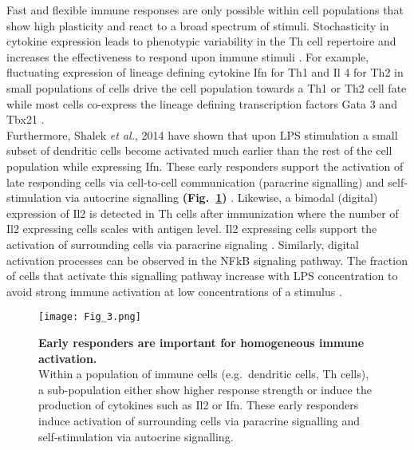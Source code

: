 Fast and flexible immune responses are only possible within cell populations that show high plasticity and react to a broad spectrum of stimuli. Stochasticity in cytokine expression leads to phenotypic variability in the \Gls{Th} cell repertoire and increases the effectiveness to respond upon immune stimuli \citep{Schrom2017}. For example, fluctuating expression of lineage defining cytokine \gls{Ifn}\textgamma{} for Th1 and \gls{Il} 4 for Th2 in small populations of cells drive the cell population towards a Th1 or Th2 cell fate while most cells co-express the lineage defining transcription factors \Gls{Gata} 3 and \Gls{Tbx21} \citep{Fang2013a, Antebi2013}.\\

Furthermore, Shalek \textit{et al.}, 2014 have shown that upon \gls{LPS} stimulation a small subset of dendritic cells become activated much earlier than the rest of the cell population while expressing \gls{Ifn}\textbeta. These early responders support the activation of late responding cells via cell-to-cell communication (paracrine signalling) and self-stimulation via autocrine signalling \textbf{(Fig.~\ref{fig0:noise_immune})} \citep{Shalek2014}. Likewise, a bimodal (digital) expression of Il2 is detected in \gls{Th} cells after immunization where the number of Il2 expressing cells scales with antigen level. Il2 expressing cells support the activation of surrounding cells via paracrine signaling \citep{Fuhrmann2016}. Similarly, digital activation processes can be observed in the \gls{NFkB} signaling pathway. The fraction of cells that activate this signalling pathway increase with LPS concentration to avoid strong immune activation at low concentrations of a stimulus \citep{Kellogg2015b}.

\begin{figure}[!h]
\centering
\texttt{[image: Fig\_3.png]}
\caption[Early responders are important for homogeneous immune activation]{\textbf{Early responders are important for homogeneous immune activation.}\\
Within a population of immune cells (e.g.~dendritic cells, \gls{Th} cells), a sub-population either show higher response strength or induce the production of cytokines such as Il2 or \gls{Ifn}\textbeta. These early responders induce activation of surrounding cells via paracrine signalling and self-stimulation via autocrine signalling.}
\label{fig0:noise_immune}
\end{figure}

\vspace{-5mm}

